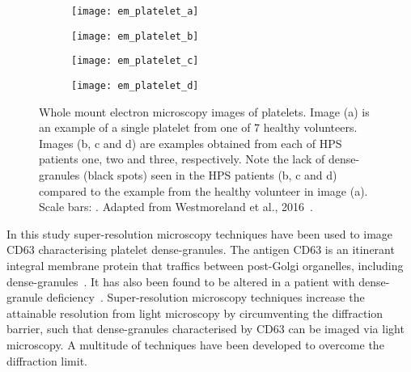 \begin{figure}[htbp]\centering
	\begin{subfigure}[b]{0.245\linewidth}
		\centering
		\texttt{[image: em\_platelet\_a]}
		\caption{}
		\label{figure:introduction:em_platelet_a}
		\vspace{1ex}
	\end{subfigure}
	\begin{subfigure}[b]{0.245\linewidth}
		\centering
		\texttt{[image: em\_platelet\_b]}
		\caption{}
		\label{figure:introduction:em_platelet_b}
		\vspace{1ex}
	\end{subfigure}
	\begin{subfigure}[b]{0.245\linewidth}
		\centering
		\texttt{[image: em\_platelet\_c]}
		\caption{}
		\label{figure:introduction:em_platelet_c}
		\vspace{1ex}
	\end{subfigure}
	\begin{subfigure}[b]{0.245\linewidth}
		\centering
		\texttt{[image: em\_platelet\_d]}
		\caption{}
		\label{figure:introduction:em_platelet_d}
		\vspace{1ex}
	\end{subfigure}
\caption[Whole mount electron microscopy images of platelets]{Whole mount electron microscopy images of platelets. Image (a) is an example of a single platelet from one of 7 healthy volunteers. Images (b, c and d) are examples obtained from each of HPS patients one, two and three, respectively. Note the lack of dense-granules (black spots) seen in the HPS patients (b, c and d) compared to the example from the healthy volunteer in image (a). Scale bars: . Adapted from Westmoreland et al., 2016~\cite{Westmoreland2016}.}
\label{figure:introduction:em_platelet}
\end{figure}

In this study super-resolution microscopy techniques have been used to image CD63 characterising platelet dense-granules. The antigen CD63 is an itinerant integral membrane protein that traffics between post-Golgi organelles, including dense-granules~\cite{Pols2009}. It has also been found to be altered in a patient with dense-granule deficiency~\cite{Westmoreland2016}. Super-resolution microscopy techniques increase the attainable resolution from light microscopy by circumventing the diffraction barrier, such that dense-granules characterised by CD63 can be imaged via light microscopy. A multitude of techniques have been developed to overcome the diffraction limit.

